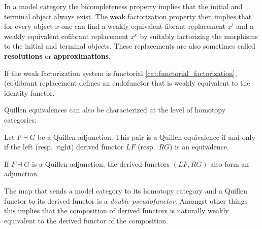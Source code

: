     \begin{property}[Resolution]
        In a model category the bicompleteness property implies that the initial and terminal object always exist. The weak factorization property then implies that for every object $x$ one can find a weakly equivalent fibrant replacement $x^\mathrm{f}$ and a weakly equivalent cofibrant replacement $x^\mathrm{c}$ by suitably factorizing the morphisms to the initial and terminal objects. These replacements are also sometimes called \textbf{resolutions} or \textbf{approximations}.

        If the weak factorization system is functorial \ref{cat:functorial_factorization}, (co)fibrant replacement defines an endofunctor that is weakly equivalent to the identity functor.
    \end{property}

    Quillen equivalences can also be characterized at the level of homotopy categories:
    \begin{property}
        Let $F\dashv G$ be a Quillen adjunction. This pair is a Quillen equivalence if and only if the left (resp.~right) derived functor $LF$ (resp.~$RG$) is an equivalence.
    \end{property}
    \begin{property}
        If $F\dashv G$ is a Quillen adjunction, the derived functors $(LF,RG)$ also form an adjunction.
    \end{property}

    \begin{property}
        The map that sends a model category to its homotopy category and a Quillen functor to its derived functor is a \textit{double pseudofunctor}. Amongst other things this implies that the composition of derived functors is naturally weakly equivalent to the derived functor of the composition.
    \end{property}

